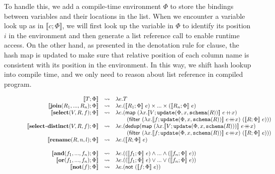 To handle this, we add a compile-time environment $\Phi$ to store the bindings between variables and their locations in the  list. When we encounter a variable look up as in $\llbracket \mathit{c};\Phi \rrbracket $, we will first look up the variable in $\Phi$ to identify its position $i$ in the environment and then generate a list reference call  to enable runtime access. On the other hand, as presented in the denotation rule for  clause, the hash map is updated to make sure that relative position of each column name is consistent with its position in the environment. In this way, we shift hash lookup into compile time, and we only need to reason about list reference in compiled program.

\begin{figure}[ht]
\[
\begin{array}{rcl}
 \llbracket T; \Phi  \rrbracket& \leadsto& \lambda e.T\\
\llbracket \mathbf{join}(R_1,...,R_n);\Phi \rrbracket &\leadsto& \lambda e.(\llbracket R_1; \Phi\rrbracket~e)\times...\times(\llbracket R_n;\Phi\rrbracket~e)\\
\llbracket \mathbf{select}(V, R, f);\Phi \rrbracket &\leadsto& \lambda e. (\mathsf{map}~(\lambda x.\llbracket V;\mathtt{update}(\Phi, x, \mathtt{schema}(R)) \rrbracket~ e\concat x)\\
& & \qquad(\mathsf{filter}~(\lambda x.\llbracket f; \mathtt{update}(\Phi, x,\mathtt{schema}(R))\rrbracket~e\concat x)~ (\llbracket R;\Phi \rrbracket~e)))\\
\llbracket \mathbf{select\code{-}distinct}(V, R, f);\Phi \rrbracket &\leadsto& \lambda e. (\mathsf{dedup} (\mathsf{map}~(\lambda x.\llbracket V;\mathtt{update}(\Phi, x, \mathtt{schema}(R))) \rrbracket~ e\concat x)\\
& & \qquad(\mathsf{filter}~(\lambda x.\llbracket f; \mathtt{update}(\Phi, x,\mathtt{schema}(R))\rrbracket~e\concat x)~ (\llbracket R;\Phi \rrbracket~e)))\\
\llbracket \mathbf{rename}(R, n, l);\Phi \rrbracket &\leadsto& \lambda e.(\llbracket R; \Phi\rrbracket~e)\\
\\
 \llbracket \mathbf{and}(f_1,...,f_n);\Phi \rrbracket &\leadsto& \lambda e.((\llbracket f_1;\Phi \rrbracket~e) \land ... \land (\llbracket f_n;\Phi \rrbracket~e))\\
\llbracket \mathbf{or}(f_1,...,f_n);\Phi \rrbracket &\leadsto& \lambda e.((\llbracket f_1;\Phi \rrbracket~e) \lor ... \lor (\llbracket f_n;\Phi \rrbracket~e))\\
\llbracket \mathbf{not}(f);\Phi \rrbracket &\leadsto& \lambda e.(\mathsf{not}~(\llbracket f;\Phi \rrbracket~e))\\


\end{array}\]
\end{figure}
